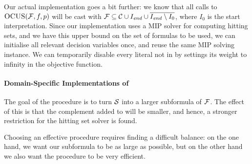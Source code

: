 Our actual implementation goes a bit further: we know that all calls to $\textsc{OCUS}(\mathcal{F} ,f,p)$ will be cast with $\mathcal{F}  \subseteq \mathcal{C}\cup I_\mathit{end}  \cup \overline{I_\mathit{end}  \setminus I_0}$, where $I_0$ is the start interpretation. Since our implementation uses a MIP solver for computing hitting sets, and we have this upper bound on the set of formulas to be used, we can initialise all relevant decision variables once, and reuse the same MIP solving instance. We can temporarily disable every literal not in \formula by settings its weight to infinity in the objective function.




\paragraph{Domain-Specific Implementations of \grow} \label{para:domainspecificgrow}

The goal of the \grow procedure is to turn $\mathcal{S}$ into a larger subformula of $\mathcal{F} $. The effect of this is that the complement added to \setstohit will be smaller, and hence, a stronger restriction for the hitting set solver is found.  

Choosing an effective \grow procedure requires finding a difficult balance: on the one hand, we want our subformula to be as large as possible, %
but on the other hand we also want the procedure to be very efficient. 


